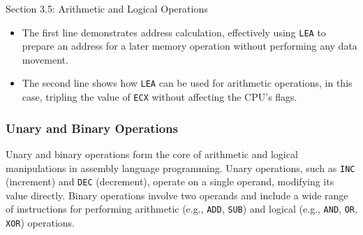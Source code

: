 \begin{notes}{Section 3.5: Arithmetic and Logical Operations}
\begin{highlight}
        \begin{itemize}
            \item The first line demonstrates address calculation, effectively using \texttt{LEA} to prepare an address for a later memory operation without performing any data movement.
            \item The second line shows how \texttt{LEA} can be used for arithmetic operations, in this case, tripling the value of \texttt{ECX} without affecting the CPU's flags.
        \end{itemize}
    \end{highlight}

    \subsubsection*{Unary and Binary Operations}

    Unary and binary operations form the core of arithmetic and logical manipulations in assembly language programming. Unary operations, such as \texttt{INC} (increment) and \texttt{DEC} 
    (decrement), operate on a single operand, modifying its value directly. Binary operations involve two operands and include a wide range of instructions for performing arithmetic (e.g., 
    \texttt{ADD}, \texttt{SUB}) and logical (e.g., \texttt{AND}, \texttt{OR}, \texttt{XOR}) operations.
    

\end{notes}
